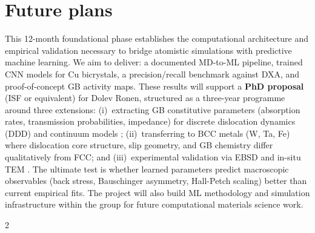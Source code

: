 \documentclass[11pt]{article}
\begin{document}
\section*{Future plans}

This 12-month foundational phase establishes the computational architecture and empirical validation necessary to bridge atomistic simulations with predictive machine learning. We aim to deliver: a documented MD-to-ML pipeline, trained CNN models for Cu bicrystals, a precision/recall benchmark against DXA, and proof-of-concept GB activity maps.
These results will support a \textbf{PhD proposal} (ISF or equivalent) for Dolev Ronen, structured as a three-year programme around three extensions:
(i)~extracting GB constitutive parameters (absorption rates, transmission probabilities, impedance) for discrete dislocation dynamics (DDD) and continuum models \cite{Piao2022,LeBauschinger2018,Bertin2024};
(ii)~transferring to BCC metals (W, Ta, Fe) where dislocation core structure, slip geometry, and GB chemistry differ qualitatively from FCC;
and (iii)~experimental validation via EBSD and in-situ TEM \cite{Gautier2025}.
The ultimate test is whether learned parameters predict macroscopic observables (back stress, Bauschinger asymmetry, Hall-Petch scaling) better than current empirical fits.
The project will also build ML methodology and simulation infrastructure within the group for future computational materials science work.

{\footnotesize
\begin{multicols}{2}


\end{multicols}
}
\end{document}
